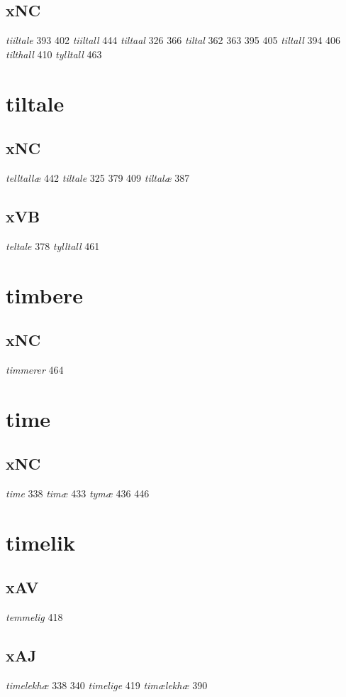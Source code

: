 \documentclass[a4paper,twocolumn]{article}
\begin{document}
\subsection{xNC}
\label{sec:orgdcde67d}
\emph{tiiltale} 393 402 \emph{tiiltall} 444 \emph{tiltaal} 326 366 \emph{tiltal} 362 363 395 405 \emph{tiltall} 394 406 \emph{tilthall} 410 \emph{tylltall} 463 
\section{tiltale}
\label{sec:org5e78f25}
\subsection{xNC}
\label{sec:org82b7e4b}
\emph{telltallæ} 442 \emph{tiltale} 325 379 409 \emph{tiltalæ} 387 
\subsection{xVB}
\label{sec:org60ff105}
\emph{teltale} 378 \emph{tylltall} 461 
\section{timbere}
\label{sec:orgb26fbcb}
\subsection{xNC}
\label{sec:org2266a36}
\emph{timmerer} 464 
\section{time}
\label{sec:org3c9ac35}
\subsection{xNC}
\label{sec:orgf6c74a0}
\emph{time} 338 \emph{timæ} 433 \emph{tymæ} 436 446 
\section{timelik}
\label{sec:orga716a76}
\subsection{xAV}
\label{sec:orgcc36c14}
\emph{temmelig} 418 
\subsection{xAJ}
\label{sec:org3eb0ca3}
\emph{timelekhæ} 338 340 \emph{timelige} 419 \emph{timælekhæ} 390 
\end{document}

